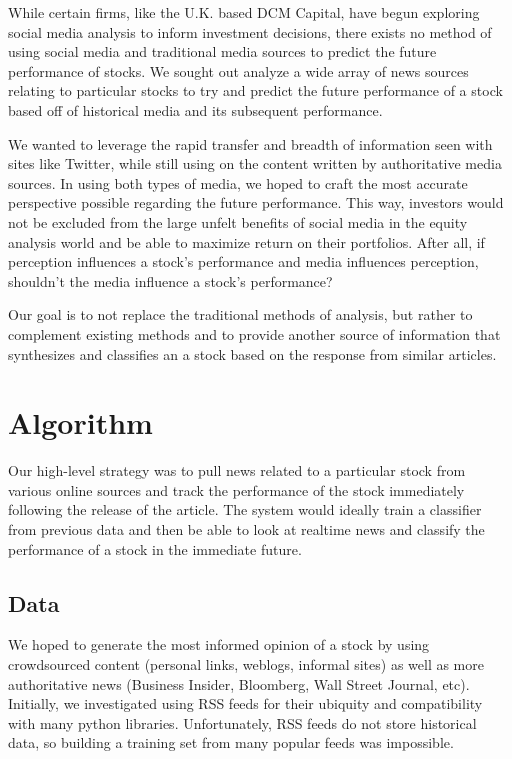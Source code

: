 \documentclass[letterpaper]{article}
\begin{document}
While certain firms, like the U.K. based DCM Capital, have begun exploring social media analysis to inform investment decisions, there exists no method of using social media and traditional media sources to predict the future performance of stocks. We sought out analyze a wide array of news sources relating to particular stocks to try and predict the future performance of a stock based off of historical media and its subsequent performance. 

We wanted to leverage the rapid transfer and breadth of information seen with sites like Twitter, while still using on the content written by authoritative media sources. In using both types of media, we hoped to craft the most accurate perspective possible regarding the future performance. This way, investors would not be excluded from the large unfelt benefits of social media in the equity analysis world and be able to maximize return on their portfolios. After all, if perception influences a stock's performance and media influences perception, shouldn't the media influence a stock's performance?

Our goal is to not replace the traditional methods of analysis, but rather to complement existing methods and to provide another source of information that synthesizes and classifies an a stock based on the response from similar articles.

\section{Algorithm}
\noindent Our high-level strategy was to pull news related to a particular stock from various online sources and track the performance of the stock immediately following the release of the article. The system would ideally train a classifier from previous data and then be able to look at realtime news and classify the performance of a stock in the immediate future.

\subsection{Data}
\noindent We hoped to generate the most informed opinion of a stock by using crowdsourced content (personal links, weblogs, informal sites) as well as more authoritative news (Business Insider, Bloomberg, Wall Street Journal, etc). Initially, we investigated using RSS feeds for their ubiquity and compatibility with many python libraries. Unfortunately, RSS feeds do not store historical data, so building a training set from many popular feeds was impossible. 
\end{document}
